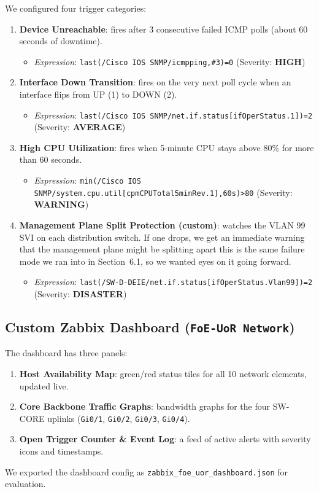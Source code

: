 \documentclass[11pt,a4paper]{article}
\begin{document}
We configured four trigger categories:
\begin{enumerate}
    \item \textbf{Device Unreachable}: fires after 3 consecutive failed ICMP polls (about 60 seconds of downtime).
    \begin{itemize}
        \item \textit{Expression}: \texttt{last(/Cisco IOS SNMP/icmpping,\#3)=0} (Severity: \textbf{HIGH})
    \end{itemize}
    \item \textbf{Interface Down Transition}: fires on the very next poll cycle when an interface flips from UP (1) to DOWN (2).
    \begin{itemize}
        \item \textit{Expression}: \texttt{last(/Cisco IOS SNMP/net.if.status[ifOperStatus.1])=2} (Severity: \textbf{AVERAGE})
    \end{itemize}
    \item \textbf{High CPU Utilization}: fires when 5-minute CPU stays above 80\% for more than 60 seconds.
    \begin{itemize}
        \item \textit{Expression}: \texttt{min(/Cisco IOS SNMP/system.cpu.util[cpmCPUTotal5minRev.1],60s)>80} (Severity: \textbf{WARNING})
    \end{itemize}
    \item \textbf{Management Plane Split Protection (custom)}: watches the VLAN 99 SVI on each distribution switch. If one drops, we get an immediate warning that the management plane might be splitting apart this is the same failure mode we ran into in Section~6.1, so we wanted eyes on it going forward.
    \begin{itemize}
        \item \textit{Expression}: \texttt{last(/SW-D-DEIE/net.if.status[ifOperStatus.Vlan99])=2} (Severity: \textbf{DISASTER})
    \end{itemize}
\end{enumerate}

\subsection{Custom Zabbix Dashboard (\texttt{FoE-UoR Network})}

The dashboard has three panels:
\begin{enumerate}
    \item \textbf{Host Availability Map}: green/red status tiles for all 10 network elements, updated live.
    \item \textbf{Core Backbone Traffic Graphs}: bandwidth graphs for the four SW-CORE uplinks (\texttt{Gi0/1}, \texttt{Gi0/2}, \texttt{Gi0/3}, \texttt{Gi0/4}).
    \item \textbf{Open Trigger Counter \& Event Log}: a feed of active alerts with severity icons and timestamps.
\end{enumerate}
We exported the dashboard config as \texttt{zabbix\_foe\_uor\_dashboard.json} for evaluation.
\end{document}
